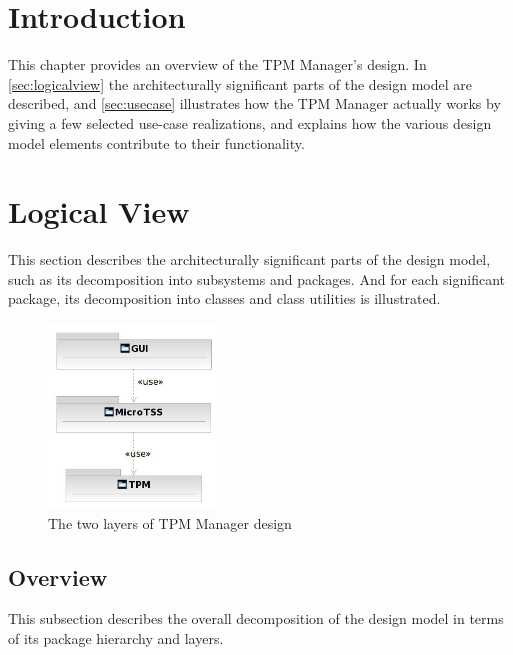 \documentclass[
  american        %
]{sirrixreport}
\begin{document}
\section{Introduction}
This chapter provides an overview of the TPM Manager's design.
In \autoref{sec:logicalview} the architecturally significant parts of the  design model are described, and \autoref{sec:usecase} 
illustrates how the TPM Manager actually works by giving a few selected use-case realizations, and explains how the various design 
model elements contribute to their functionality.


\section{Logical View} 
\label{sec:logicalview}

This section describes the architecturally significant parts of the
design model, such as its decomposition into subsystems and
packages. And for each significant package, its decomposition into
classes and class utilities is illustrated. 

\begin{figure}[h]
 \centering
 \includegraphics[width=0.4\textwidth]{images/arch_layers}
 \caption{The two layers of TPM Manager design}
 \label{highleveldesign}
\end{figure}
\clearpage

\subsection{Overview}
This subsection describes the overall decomposition of the design model in terms of
its package hierarchy and layers. 
\end{document}
